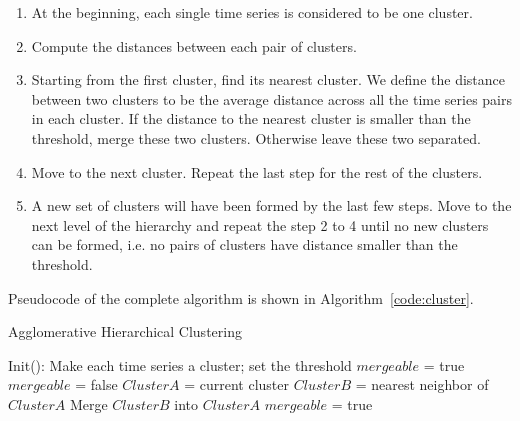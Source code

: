 \begin{enumerate}
\item At the beginning, each single time series is considered to be one cluster.
\item Compute the distances between each pair of clusters.
\item Starting from the first cluster, find its nearest cluster.
We define the distance between two clusters to be the average distance across all the time series pairs in each cluster.
  If the distance to the nearest cluster is smaller than the threshold, merge these two
  clusters. Otherwise leave these two separated.
\item Move to the next cluster. Repeat the last step for the rest of the clusters.
\item A new set of clusters will have been formed by the last few
  steps. Move to the next level of the hierarchy and repeat the step 2
  to 4 until no new clusters can be formed, i.e. no pairs of clusters have distance smaller than the threshold.
\end{enumerate}

Pseudocode of the complete algorithm is shown in
Algorithm~\ref{code:cluster}.

\begin{algorithm}
  \caption{Agglomerative Hierarchical Clustering}
  \begin{algorithmic}[1]
    \State Init(): Make each time series a cluster; set the threshold\;
    \State $mergeable$ = true\;
      \State $mergeable$ = false\;
        \State $ClusterA$ = current cluster\;
        \State $ClusterB$ = nearest neighbor of $ClusterA$\;
            \State Merge $ClusterB$ into $ClusterA$\;
            \State $mergeable$ = true\;
        \EndIf
      \EndFor
    \EndWhile
    \EndFunction
  \end{algorithmic}
  \label{code:cluster}
\end{algorithm}



